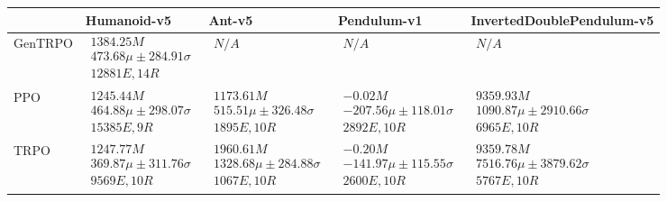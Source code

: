\begin{tabular}{|l|p{3.2cm}|p{3.2cm}|p{3.2cm}|p{3.2cm}|}
\toprule
 & Humanoid-v5 & Ant-v5 & Pendulum-v1 & InvertedDoublePendulum-v5 \\
\midrule
GenTRPO & $\begin{array}{c} 1384.25M \\ 473.68\mu \pm 284.91\sigma \\ 12881E, 14R \end{array}$ & $\begin{array}{c} N/A \end{array}$ & $\begin{array}{c} N/A \end{array}$ & $\begin{array}{c} N/A \end{array}$ \\  \hline
PPO & $\begin{array}{c} 1245.44M \\ 464.88\mu \pm 298.07\sigma \\ 15385E, 9R \end{array}$ & $\begin{array}{c} 1173.61M \\ 515.51\mu \pm 326.48\sigma \\ 1895E, 10R \end{array}$ & $\begin{array}{c} -0.02M \\ -207.56\mu \pm 118.01\sigma \\ 2892E, 10R \end{array}$ & $\begin{array}{c} 9359.93M \\ 1090.87\mu \pm 2910.66\sigma \\ 6965E, 10R \end{array}$ \\  \hline
TRPO & $\begin{array}{c} 1247.77M \\ 369.87\mu \pm 311.76\sigma \\ 9569E, 10R \end{array}$ & $\begin{array}{c} 1960.61M \\ 1328.68\mu \pm 284.88\sigma \\ 1067E, 10R \end{array}$ & $\begin{array}{c} -0.20M \\ -141.97\mu \pm 115.55\sigma \\ 2600E, 10R \end{array}$ & $\begin{array}{c} 9359.78M \\ 7516.76\mu \pm 3879.62\sigma \\ 5767E, 10R \end{array}$ \\  \hline

\end{tabular}
